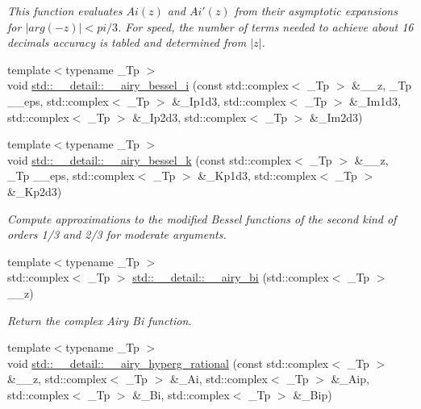\begin{DoxyCompactItemize}
\begin{DoxyCompactList}\small\item\em This function evaluates $ Ai(z) $ and $ Ai'(z) $ from their asymptotic expansions for $ |arg(-z)| < pi/3 $. For speed, the number of terms needed to achieve about 16 decimals accuracy is tabled and determined from $ |z| $. \end{DoxyCompactList}\item 
{\footnotesize template$<$typename \+\_\+\+Tp $>$ }\\void \hyperlink{namespacestd_1_1____detail_aee6c743187765ce9a1f9c4c9af4acf17}{std\+::\+\_\+\+\_\+detail\+::\+\_\+\+\_\+airy\+\_\+bessel\+\_\+i} (const std\+::complex$<$ \+\_\+\+Tp $>$ \&\+\_\+\+\_\+z, \+\_\+\+Tp \+\_\+\+\_\+eps, std\+::complex$<$ \+\_\+\+Tp $>$ \&\+\_\+\+Ip1d3, std\+::complex$<$ \+\_\+\+Tp $>$ \&\+\_\+\+Im1d3, std\+::complex$<$ \+\_\+\+Tp $>$ \&\+\_\+\+Ip2d3, std\+::complex$<$ \+\_\+\+Tp $>$ \&\+\_\+\+Im2d3)
\item 
{\footnotesize template$<$typename \+\_\+\+Tp $>$ }\\void \hyperlink{namespacestd_1_1____detail_a01098dbe1615b5be0833a7f3573f6510}{std\+::\+\_\+\+\_\+detail\+::\+\_\+\+\_\+airy\+\_\+bessel\+\_\+k} (const std\+::complex$<$ \+\_\+\+Tp $>$ \&\+\_\+\+\_\+z, \+\_\+\+Tp \+\_\+\+\_\+eps, std\+::complex$<$ \+\_\+\+Tp $>$ \&\+\_\+\+Kp1d3, std\+::complex$<$ \+\_\+\+Tp $>$ \&\+\_\+\+Kp2d3)
\begin{DoxyCompactList}\small\item\em Compute approximations to the modified Bessel functions of the second kind of orders 1/3 and 2/3 for moderate arguments. \end{DoxyCompactList}\item 
{\footnotesize template$<$typename \+\_\+\+Tp $>$ }\\std\+::complex$<$ \+\_\+\+Tp $>$ \hyperlink{namespacestd_1_1____detail_ae5536305d721e393efe1a74f0e57653e}{std\+::\+\_\+\+\_\+detail\+::\+\_\+\+\_\+airy\+\_\+bi} (std\+::complex$<$ \+\_\+\+Tp $>$ \+\_\+\+\_\+z)
\begin{DoxyCompactList}\small\item\em Return the complex Airy Bi function. \end{DoxyCompactList}\item 
{\footnotesize template$<$typename \+\_\+\+Tp $>$ }\\void \hyperlink{namespacestd_1_1____detail_aedc8a8cc144aa56f72728db7d62e3e62}{std\+::\+\_\+\+\_\+detail\+::\+\_\+\+\_\+airy\+\_\+hyperg\+\_\+rational} (const std\+::complex$<$ \+\_\+\+Tp $>$ \&\+\_\+\+\_\+z, std\+::complex$<$ \+\_\+\+Tp $>$ \&\+\_\+\+Ai, std\+::complex$<$ \+\_\+\+Tp $>$ \&\+\_\+\+Aip, std\+::complex$<$ \+\_\+\+Tp $>$ \&\+\_\+\+Bi, std\+::complex$<$ \+\_\+\+Tp $>$ \&\+\_\+\+Bip)

\end{DoxyCompactItemize}
